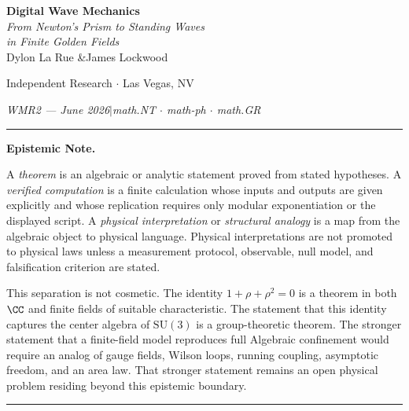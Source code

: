 \begin{center}
\vspace*{0.5em}
{\LARGE\bfseries Digital Wave Mechanics}\\[12pt]
{\large\itshape From Newton's Prism to Standing Waves\\
in Finite Golden Fields}\\[8pt]

\vspace{1.5em}
{\large Dylon La Rue \quad\&\quad James Lockwood}

\vspace{0.5em}
{\small Independent Research $\cdot$ Las Vegas, NV}

\vspace{0.5em}
{\small\itshape WMR2 --- June 2026\quad$|$\quad math.NT $\cdot$ math-ph $\cdot$ math.GR}
\end{center}

\vspace{1em}

\newpage

\newpage

\vspace{0.5em}
\noindent\rule{\linewidth}{0.4pt}
{\small\noindent\textbf{Epistemic Note.}

A \emph{theorem} is an algebraic or analytic statement proved from stated hypotheses. A \emph{verified computation} is a finite calculation whose inputs and outputs are given explicitly and whose replication requires only modular exponentiation or the displayed script. A \emph{physical interpretation} or \emph{structural analogy} is a map from the algebraic object to physical language. Physical interpretations are not promoted to physical laws unless a measurement protocol, observable, null model, and falsification criterion are stated.

This separation is not cosmetic. The identity $1 + \rho + \rho^2 = 0$ is a theorem in both $\CC$ and finite fields of suitable characteristic. The statement that this identity captures the center algebra of $\mathrm{SU}(3)$ is a group-theoretic theorem. The stronger statement that a finite-field model reproduces full Algebraic confinement would require an analog of gauge fields, Wilson loops, running coupling, asymptotic freedom, and an area law. That stronger statement remains an open physical problem residing beyond this epistemic boundary.}
\noindent\rule{\linewidth}{0.4pt}
\vspace{0.5em}


